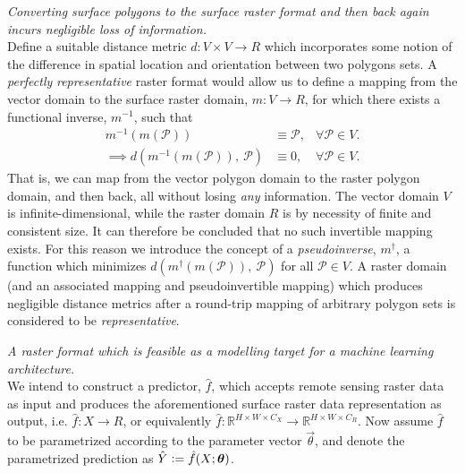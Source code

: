 \begin{description}[style=nextline]
  \item[Representative]
    \textit{Converting surface polygons to the surface raster format and then back again incurs negligible loss of information.}
    \\
    Define a suitable distance metric $d: V \times V \rightarrow{R}$ which incorporates some notion of the difference in spatial location and orientation between two polygons sets.
    A \emph{perfectly} \textit{representative} raster format would allow us to define a mapping from the vector domain to the surface raster domain, $m: V \rightarrow R$, for which there exists a functional inverse, $m^{-1}$, such that
    \begin{align*}
      m^{-1}\left(m(\mathcal{P})\right)
      &\equiv
      \mathcal{P},
      &\forall \mathcal{P} \in V.
      \\
      \implies d\left(
        m^{-1}(m(\mathcal{P})),~\mathcal{P}
      \right)
      &\equiv
      0,
      &\forall \mathcal{P} \in V.
    \end{align*}
    That is, we can map from the vector polygon domain to the raster polygon domain, and then back, all without losing \emph{any} information.
    The vector domain $V$ is infinite-dimensional, while the raster domain $R$ is by necessity of finite and consistent size.
    It can therefore be concluded that no such invertible mapping exists.
    For this reason we introduce the concept of a \textit{pseudoinverse}, $m^{\dagger}$, a function which minimizes $d(m^{\dagger}(m(\mathcal{P})),~\mathcal{P})$ for all $\mathcal{P} \in V$.
    A raster domain (and an associated mapping and pseudoinvertible mapping) which produces negligible distance metrics after a round-trip mapping of arbitrary polygon sets is considered to be \textit{representative}.
  \item[Targetable] 
    \textit{A raster format which is feasible as a modelling target for a machine learning architecture.}
    \\
    We intend to construct a predictor, $\hat{f}$, which accepts remote sensing raster data as input and produces the aforementioned surface raster data representation as output, i.e.  $\hat{f}: X \rightarrow R$, or equivalently
    $
      \hat{f}:
        \mathbb{R}^{H \times W \times C_X}
        \rightarrow
        \mathbb{R}^{H \times W \times C_R}
    $.
    Now assume $\hat{f}$ to be parametrized according to the parameter vector $\vec{\theta}$, and denote the parametrized prediction as $\hat{Y} \vcentcolon= \hat{f}(X; \boldsymbol{\theta})$.

\end{description}
